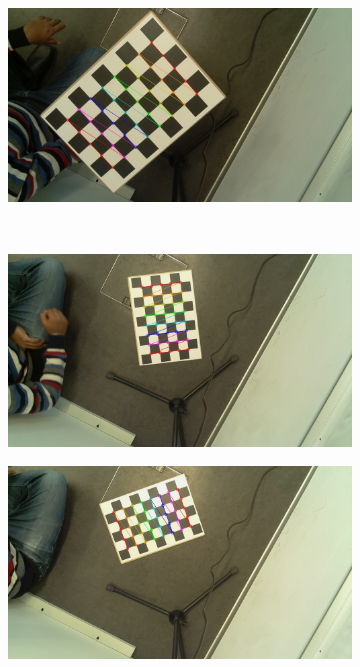\begin{figure}[H]
\begin{subfigure}{0.2\linewidth}
    \end{subfigure}
    \begin{subfigure}{0.2\linewidth}
        \includegraphics[width=\linewidth]{files/output145_4.jpg}
    \end{subfigure} \\
    \begin{subfigure}{0.2\linewidth}
        \includegraphics[width=\linewidth]{files/output145_5.jpg}
    \end{subfigure}
    \begin{subfigure}{0.2\linewidth}
        \includegraphics[width=\linewidth]{files/output145_6.jpg}

\end{subfigure}
\end{figure}
